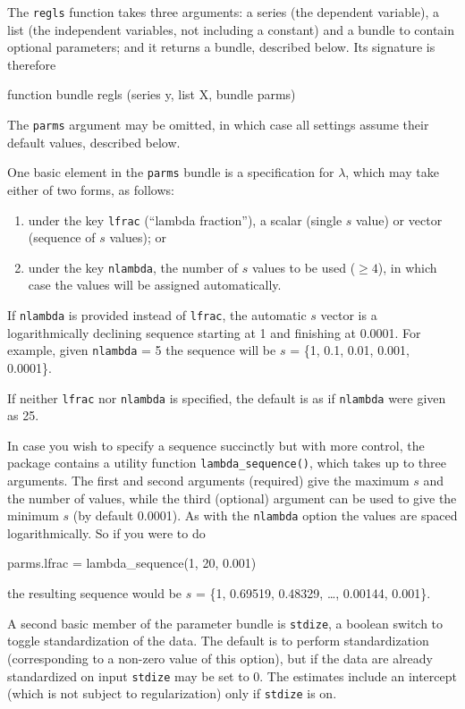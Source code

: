 \documentclass{article}
\begin{document}
The \texttt{regls} function takes three arguments: a series (the
dependent variable), a list (the independent variables, not including
a constant) and a bundle to contain optional parameters; and it
returns a bundle, described below. Its signature is therefore
\begin{code}
function bundle regls (series y, list X, bundle parms)
\end{code}

The \texttt{parms} argument may be omitted, in which case all settings
assume their default values, described below.

One basic element in the \texttt{parms} bundle is a specification for
$\lambda$, which may take either of two forms, as follows:
\begin{enumerate}
\item under the key \texttt{lfrac} (``lambda fraction''), a scalar
  (single $s$ value) or vector (sequence of $s$ values); or
\item under the key \texttt{nlambda}, the number of $s$ values to be
  used ($\geq 4$), in which case the values will be assigned
  automatically.
\end{enumerate}
If \texttt{nlambda} is provided instead of \texttt{lfrac}, the
automatic $s$ vector is a logarithmically declining sequence starting
at 1 and finishing at 0.0001. For example, given \texttt{nlambda} = 5
the sequence will be $s$ = \{1, 0.1, 0.01, 0.001, 0.0001\}.

If neither \texttt{lfrac} nor \texttt{nlambda} is specified, the
default is as if \texttt{nlambda} were given as 25.

In case you wish to specify a sequence succinctly but with more
control, the package contains a utility function
\texttt{lambda\_sequence()}, which takes up to three arguments. The
first and second arguments (required) give the maximum $s$ and the
number of values, while the third (optional) argument can be used to
give the minimum $s$ (by default 0.0001). As with the \texttt{nlambda}
option the values are spaced logarithmically.  So if you were to do
\begin{code}
parms.lfrac = lambda_sequence(1, 20, 0.001)
\end{code}
the resulting sequence would be $s$ = \{1, 0.69519, 0.48329, \dots,
0.00144, 0.001\}.

A second basic member of the parameter bundle is \texttt{stdize}, a
boolean switch to toggle standardization of the data. The default is
to perform standardization (corresponding to a non-zero value of this
option), but if the data are already standardized on input
\texttt{stdize} may be set to 0.  The estimates include an intercept
(which is not subject to regularization) only if \texttt{stdize} is
on.
\end{document}
